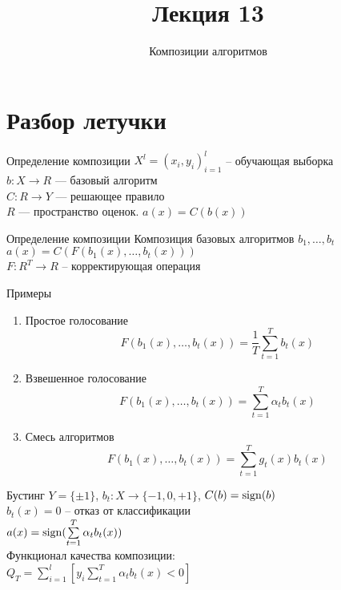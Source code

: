 \documentclass[10pt]{beamer}
\title{Лекция 13}
\subtitle{Композиции алгоритмов}
\begin{document}
\maketitle

\section{Разбор летучки}

\begin{frame}{Определение композиции}
  ${X^l = (x_i, y_i)_{i = 1}^l}$ -- обучающая выборка\\
  $b:X \rightarrow R$ --- базовый алгоритм\\
  $C:R \rightarrow Y$ --- решающее правило\\
  $R$ --- пространство оценок.
  \bigbreak
  $a(x) = C(b(x))$\\
\end{frame}

\begin{frame}{Определение композиции}
  Композиция базовых алгоритмов $b_1, \dots, b_t$\\
  \bigbreak
  $a(x) = C(F(b_1(x), \dots, b_t(x)))$\\
  $F: R^T \rightarrow R$ -- корректирующая операция
\end{frame}

\begin{frame}{Примеры}
  \begin{enumerate}
    \item Простое голосование\\
      $$F(b_1(x), \dots, b_t(x)) = \frac{1}{T} \sum\limits_{t=1}^{T} b_t(x)$$
    \item Взвешенное голосование\\
      $$F(b_1(x), \dots, b_t(x)) = \sum\limits_{t=1}^{T} \alpha_t b_t(x)$$
    \item Смесь алгоритмов\\
      $$F(b_1(x), \dots, b_t(x)) = \sum\limits_{t=1}^{T} g_t(x) b_t(x)$$      
  \end{enumerate}
\end{frame}

{
\begin{frame}{Бустинг}
  $Y = \{\pm 1\}$, $b_t: X\rightarrow \{-1, 0, +1\}$, $C(b) = \operatorname{sign}(b)$\\
  $b_t(x) = 0$ -- отказ от классификации\\
  \bigbreak
  \pause
  $a(x) = \operatorname{sign}(\sum\limits_{t=1}^{T} \alpha_t b_t(x))$\\
  \bigbreak
  Функционал качества композиции:\\
  $Q_T = \sum\limits_{i=1}^l [y_i \sum\limits_{t=1}^{T} \alpha_t b_t(x) < 0 ]$
\end{frame}
}
\end{document}

